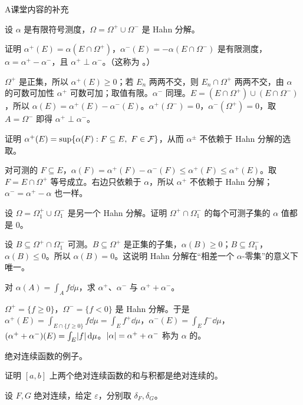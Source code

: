\begin{exercises}{A}{课堂内容的补充}
\item\label{ex:ac:A7} 设 $\alpha$ 是有限符号测度，$\Omega=\Omega^+\cup\Omega^-$ 是 Hahn 分解。
\begin{questions}
\item 证明 $\alpha^+(E)=\alpha(E\cap\Omega^+)$，$\alpha^-(E)=-\alpha(E\cap\Omega^-)$ 是有限测度，$\alpha=\alpha^+-\alpha^-$，且 $\alpha^+\perp\alpha^-$。（这称为 。）
\begin{solution}
$\Omega^+$ 是正集，所以 $\alpha^+(E)\geqslant0$；若 $E_n$ 两两不交，则 $E_n\cap\Omega^+$ 两两不交，由 $\alpha$ 的可数可加性 $\alpha^+$ 可数可加；取值有限。$\alpha^-$ 同理。$E=(E\cap\Omega^+)\cup(E\cap\Omega^-)$，所以 $\alpha(E)=\alpha^+(E)-\alpha^-(E)$。$\alpha^+(\Omega^-)=0$，$\alpha^-(\Omega^+)=0$，取 $A=\Omega^-$ 即得 $\alpha^+\perp\alpha^-$。
\end{solution}
\item 证明 $\alpha^+(E)=\sup\{\alpha(F):F\subseteq E,\ F\in\cF\}$，从而 $\alpha^\pm$ 不依赖于 Hahn 分解的选取。
\begin{solution}
对可测的 $F\subseteq E$，$\alpha(F)=\alpha^+(F)-\alpha^-(F)\leqslant\alpha^+(F)\leqslant\alpha^+(E)$。取 $F=E\cap\Omega^+$ 等号成立。右边只依赖于 $\alpha$，所以 $\alpha^+$ 不依赖于 Hahn 分解；$\alpha^-=\alpha^+-\alpha$ 也一样。
\end{solution}
\item 设 $\Omega=\Omega_1^+\cup\Omega_1^-$ 是另一个 Hahn 分解。证明 $\Omega^+\cap\Omega_1^-$ 的每个可测子集的 $\alpha$ 值都是 $0$。
\begin{solution}
设 $B\subseteq\Omega^+\cap\Omega_1^-$ 可测。$B\subseteq\Omega^+$ 是正集的子集，$\alpha(B)\geqslant0$；$B\subseteq\Omega_1^-$，$\alpha(B)\leqslant0$。所以 $\alpha(B)=0$。这说明 Hahn 分解在“相差一个 $\alpha$-零集”的意义下唯一。
\end{solution}
\item 对 $\alpha(A)=\int_Af\dd\mu$，求 $\alpha^+$、$\alpha^-$ 与 $\alpha^++\alpha^-$。
\begin{solution}
$\Omega^+=\{f\geqslant0\}$，$\Omega^-=\{f<0\}$ 是 Hahn 分解。于是 $\alpha^+(E)=\int_{E\cap\{f\geqslant0\}}f\dd\mu=\int_Ef^+\dd\mu$，$\alpha^-(E)=\int_Ef^-\dd\mu$，$(\alpha^++\alpha^-)(E)=\int_E\lvert f\rvert\,\mathrm{d}\mu$。$\lvert \alpha\rvert=\alpha^++\alpha^-$ 称为 $\alpha$ 的。
\end{solution}
\end{questions}

\item\label{ex:ac:A8} 绝对连续函数的例子。
\begin{questions}
\item 证明 $[a,b]$ 上两个绝对连续函数的和与积都是绝对连续的。
\begin{solution}
设 $F,G$ 绝对连续，给定 $\varepsilon$，分别取 $\delta_F,\delta_G$。


\end{solution}
\end{questions}
\end{exercises}
